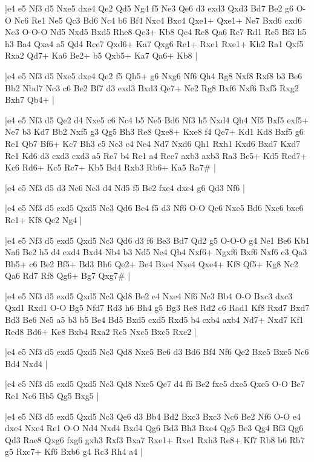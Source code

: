 \whitename{}
\blackname{}
\makegametitle
|e4 e5 Nf3 d5 Nxe5 dxe4 Qe2 Qd5 Ng4 f5 Ne3 Qe6 d3 exd3 Qxd3 Bd7 Be2 g6 O-O Nc6 Re1 Ne5 Qc3 Bd6 Nc4 b6 Bf4 Nxc4 Bxc4 Qxe1+ Qxe1+ Ne7 Bxd6 cxd6 Nc3 O-O-O Nd5 Nxd5 Bxd5 Rhe8 Qc3+ Kb8 Qc4 Rc8 Qa6 Rc7 Rd1 Re5 Bf3 h5 h3 Ba4 Qxa4 a5 Qd4 Rce7 Qxd6+ Ka7 Qxg6 Re1+ Rxe1 Rxe1+ Kh2 Ra1 Qxf5 Rxa2 Qd7+ Ka6 Be2+ b5 Qxb5+ Ka7 Qa6+ Kb8  |

\whitename{}
\blackname{}
\makegametitle
|e4 e5 Nf3 d5 Nxe5 dxe4 Qe2 f5 Qh5+ g6 Nxg6 Nf6 Qh4 Rg8 Nxf8 Rxf8 b3 Be6 Bb2 Nbd7 Nc3 c6 Be2 Bf7 d3 exd3 Bxd3 Qe7+ Ne2 Rg8 Bxf6 Nxf6 Bxf5 Rxg2 Bxh7 Qb4+  |

\whitename{}
\blackname{}
\makegametitle
|e4 e5 Nf3 d5 Qe2 d4 Nxe5 c6 Nc4 b5 Ne5 Bd6 Nf3 h5 Nxd4 Qh4 Nf5 Bxf5 exf5+ Ne7 b3 Kd7 Bb2 Nxf5 g3 Qg5 Bh3 Re8 Qxe8+ Kxe8 f4 Qe7+ Kd1 Kd8 Bxf5 g6 Re1 Qb7 Bf6+ Kc7 Bh3 c5 Nc3 c4 Ne4 Nd7 Nxd6 Qh1 Rxh1 Kxd6 Bxd7 Kxd7 Re1 Kd6 d3 cxd3 cxd3 a5 Re7 b4 Rc1 a4 Rcc7 axb3 axb3 Ra3 Be5+ Kd5 Rcd7+ Kc6 Rd6+ Kc5 Rc7+ Kb5 Bd4 Rxb3 Rb6+ Ka5 Ra7\#  |

\whitename{}
\blackname{}
\makegametitle
|e4 e5 Nf3 d5 d3 Nc6 Nc3 d4 Nd5 f5 Be2 fxe4 dxe4 g6 Qd3 Nf6  |

\whitename{}
\blackname{}
\makegametitle
|e4 e5 Nf3 d5 exd5 Qxd5 Nc3 Qd6 Bc4 f5 d3 Nf6 O-O Qc6 Nxe5 Bd6 Nxc6 bxc6 Re1+ Kf8 Qe2 Ng4  |

\whitename{}
\blackname{}
\makegametitle
|e4 e5 Nf3 d5 exd5 Qxd5 Nc3 Qd6 d3 f6 Be3 Bd7 Qd2 g5 O-O-O g4 Ne1 Be6 Kb1 Na6 Be2 h5 d4 exd4 Bxd4 Nb4 b3 Nd5 Ne4 Qb4 Nxf6+ Ngxf6 Bxf6 Nxf6 c3 Qa3 Bb5+ c6 Be2 Bf5+ Bd3 Bh6 Qe2+ Be4 Bxe4 Nxe4 Qxe4+ Kf8 Qf5+ Kg8 Nc2 Qa6 Rd7 Rf8 Qg6+ Bg7 Qxg7\#  |

\whitename{}
\blackname{}
\makegametitle
|e4 e5 Nf3 d5 exd5 Qxd5 Nc3 Qd8 Be2 e4 Nxe4 Nf6 Nc3 Bb4 O-O Bxc3 dxc3 Qxd1 Rxd1 O-O Bg5 Nfd7 Rd3 h6 Bh4 g5 Bg3 Re8 Rd2 c6 Rad1 Kf8 Rxd7 Bxd7 Bd3 Be6 Ne5 a5 b3 b5 Be4 Bd5 Bxd5 cxd5 Rxd5 b4 cxb4 axb4 Nd7+ Nxd7 Kf1 Red8 Bd6+ Ke8 Bxb4 Rxa2 Rc5 Nxc5 Bxc5 Rxc2  |

\whitename{}
\blackname{}
\makegametitle
|e4 e5 Nf3 d5 exd5 Qxd5 Nc3 Qd8 Nxe5 Be6 d3 Bd6 Bf4 Nf6 Qe2 Bxe5 Bxe5 Nc6 Bd4 Nxd4  |

\whitename{}
\blackname{}
\makegametitle
|e4 e5 Nf3 d5 exd5 Qxd5 Nc3 Qd8 Nxe5 Qe7 d4 f6 Be2 fxe5 dxe5 Qxe5 O-O Be7 Re1 Nc6 Bb5 Qg5 Bxg5  |

\whitename{}
\blackname{}
\makegametitle
|e4 e5 Nf3 d5 exd5 Qxd5 Nc3 Qe6 d3 Bb4 Bd2 Bxc3 Bxc3 Nc6 Be2 Nf6 O-O e4 dxe4 Nxe4 Re1 O-O Nd4 Nxd4 Bxd4 Qg6 Bd3 Bh3 Bxe4 Qg5 Be3 Qg4 Bf3 Qg6 Qd3 Rae8 Qxg6 fxg6 gxh3 Rxf3 Bxa7 Rxe1+ Rxe1 Rxh3 Re8+ Kf7 Rb8 b6 Rb7 g5 Rxc7+ Kf6 Bxb6 g4 Rc3 Rh4 a4  |

